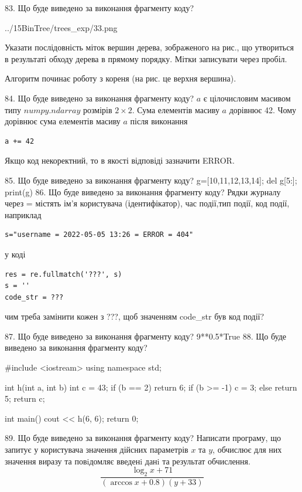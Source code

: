 \documentclass[11pt]{article}
\begin{document}
83. Що буде виведено за виконання фрагменту коду?

\begin{center}
	{../15BinTree/trees_exp/33.png}
\end{center}
Указати послідовність міток вершин дерева, зображеного на рис., що утвориться в результаті обходу дерева в прямому порядку. Мітки записувати через пробіл.\par Алгоритм починає роботу з кореня (на рис. це верхня вершина).

84. Що буде виведено за виконання фрагменту коду?
$a$ є цілочисловим масивом типу $numpy.ndarray$ розмірів $2{\times}2$. Сума елементів масиву $a$ дорівнює 42. Чому дорівнює сума елементів масиву $a$ після виконання 
\begin{verbatim}
a += 42
\end{verbatim}


Якщо код некоректний, то в якості відповіді зазначити ERROR.



85. Що буде виведено за виконання фрагменту коду?
g=[10,11,12,13,14]; del g[5:]; print(g)
86. Що буде виведено за виконання фрагменту коду?
Рядки журналу через = містять ім'я користувача (ідентифікатор), час події,тип події, код події, наприклад
\begin{verbatim}
s="username = 2022-05-05 13:26 = ERROR = 404"
\end{verbatim}
у коді 
\begin{verbatim}
res = re.fullmatch('???', s) 
s = ''
code_str = ??? 
\end{verbatim}
чим треба замінити кожен з ???, щоб значенням code\_str був код події? 



87. Що буде виведено за виконання фрагменту коду?
9**0.5*True
88. Що буде виведено за виконання фрагменту коду?

#include <iostream>
using namespace std;

int h(int a, int b){
    int c = 43;
    if (b == 2)
        return 6;
    if (b >= -1)
         c = 3;
    else 
        return 5;
    return c;
}

int main(){
    cout << h(6, 6);
    return 0;
}

89. Що буде виведено за виконання фрагменту коду?
Написати програму, що запитує у користувача значення дійсних параметрів $x$ та $y$, обчислює для них значення виразу та повiдомляє введенi данi та результат обчислення.
$$\frac{\log_{2} x + 71}{(\arccos x + 0.8) (y + 33)}$$ 
\end{document}
